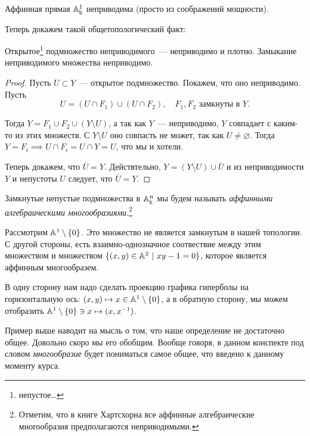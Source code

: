 	\begin{example}
		Аффинная прямая $\AA_{\bk}^1$ неприводима (просто из соображений мощности). 
	\end{example}

	Теперь докажем такой общетопологический факт:

	\begin{statement}\label{open_subset_of_irreducible} 
		Открытое\footnote{непустое\ldots} подмножество неприводимого~--- неприводимо и плотно. Замыкание неприводимого множества неприводимо. 
	\end{statement}

	\begin{proof}
		Пусть $U \subset Y$~--- открытое подмножество. Покажем, что оно неприводимо. Пусть 
		\[
			U = (U \cap F_1) \cup (U \cap F_2), \quad F_1, F_2 \text{ замкнуты в } Y.
		\]

		Тогда $Y = F_1 \cup F_2 \cup (Y \setminus U)  $, а так как $Y$~--- неприводимо, $Y$ совпадает с каким-то из этих множеств. С $Y \setminus U$ оно совпасть не может, так как $U \neq \varnothing$. Тогда $Y = F_i \implies U \cap F_i = U \cap Y = U$, что мы и хотели. 

		Теперь докажем, что $\overline{U} = Y$. Действтельно, $Y = (Y \setminus U) \cup \overline{U}$ и из неприводимости $Y$ и непустоты $U$ следует, что $\overline{U} = Y$.
	\end{proof}

	\begin{definition} 
		Замкнутые непустые подмножества в $\AA_{\bk}^n$ мы будем называть \emph{аффинными алгебраическими многообразиями}.\footnote{Отметим, что в книге Хартсхорна все аффинные алгебраические многообразия предполагаются неприводимыми. }
	\end{definition}

	\begin{example}
		Рассмотрим $\AA^1 \setminus \{ 0 \}$. Это множество не является замкнутым в нашей топологии. С другой стороны, есть взаимно-однозначное соотвествие между этим множеством и множеством $ \{ (x, y) \in \AA^2 \ \vert \ xy - 1 = 0 \}$, которое является аффинным многообразем. 

		В одну сторону нам надо сделать проекцию графика гиперболы на горизонтальную ось: $(x, y) \mapsto x \in \AA^1 \setminus \{ 0 \}$, а в обратную сторону, мы можем отобразить $\AA^1 \setminus \{ 0 \} \ni x \mapsto (x, x^{-1})$.
	\end{example}

	\begin{remark}
		Пример выше наводит на мысль о том, что наше определение не достаточно общее. Довольно скоро мы его обобщим. Вообще говоря, в данном конспекте под словом \emph{многообразие} будет пониматься самое общее, что введено к данному моменту курса. 
	\end{remark}

